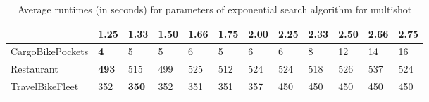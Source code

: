 \begin{table}[ht]
\centering
\caption{Average runtimes (in seconds) for  parameters of exponential search algorithm for multishot}
\label{tab:results:exponential}
\begin{tabular}{l|lllllllllll}
\toprule
 & 1.25 & 1.33 & 1.50 & 1.66 & 1.75 & 2.00 & 2.25 & 2.33 & 2.50 & 2.66 & 2.75 \\
\midrule
CargoBikePockets & \textbf{4} & 5 & 5 & 6 & 5 & 6 & 6 & 8 & 12 & 14 & 16 \\
\cline{1-12}
Restaurant & \textbf{493} & 515 & 499 & 525 & 512 & 524 & 524 & 518 & 526 & 537 & 524 \\
\cline{1-12}
TravelBikeFleet & 352 & \textbf{350} & 352 & 351 & 351 & 357 & 450 & 450 & 450 & 450 & 450 \\
\cline{1-12}
\bottomrule
\end{tabular}
\end{table}
